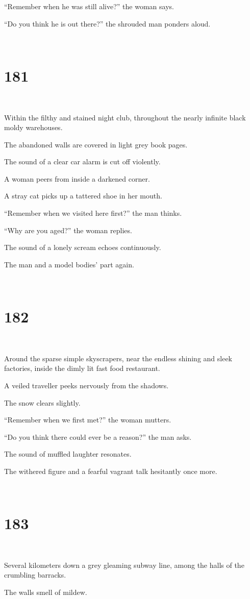 \documentclass{report}
\begin{document}
``Remember when he was still alive?'' the woman says.

``Do you think he is out there?'' the shrouded man ponders aloud.

~
\chapter*{181}
~

Within the filthy and stained night club, throughout the nearly infinite black moldy warehouses.

The abandoned walls are covered in light grey book pages.

The sound of a clear car alarm is cut off violently.

A woman peers from inside a darkened corner.

A stray cat picks up a tattered shoe in her mouth.

``Remember when we visited here first?'' the man thinks.

``Why are you aged?'' the woman replies.

The sound of a lonely scream echoes continuously.

The man and a model bodies' part again.

~
\chapter*{182}
~

Around the sparse simple skyscrapers, near the endless shining and sleek factories, inside the dimly lit fast food restaurant.

A veiled traveller peeks nervously from the shadows.

The snow clears slightly.

``Remember when we first met?'' the woman mutters.

``Do you think there could ever be a reason?'' the man asks.

The sound of muffled laughter resonates.

The withered figure and a fearful vagrant talk hesitantly once more.

~
\chapter*{183}
~

Several kilometers down a grey gleaming subway line, among the halls of the crumbling barracks.

The walls smell of mildew.
\end{document}
